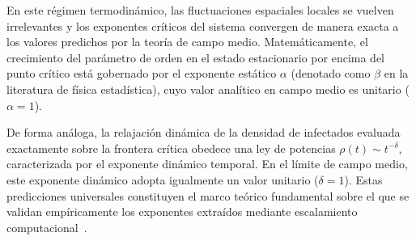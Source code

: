 \documentclass[%
reprint,
amsmath,amssymb,
aps,
]{revtex4-2}
\begin{document}
	En este régimen termodinámico, las fluctuaciones espaciales locales se vuelven irrelevantes y los exponentes críticos del sistema convergen de manera exacta a los valores predichos por la teoría de campo medio. Matemáticamente, el crecimiento del parámetro de orden en el estado estacionario por encima del punto crítico está gobernado por el exponente estático $\alpha$ (denotado como $\beta$ en la literatura de física estadística), cuyo valor analítico en campo medio es unitario ($\alpha = 1$). 
	
	De forma análoga, la relajación dinámica de la densidad de infectados evaluada exactamente sobre la frontera crítica obedece una ley de potencias $\rho(t) \sim t^{-\delta}$, caracterizada por el exponente dinámico temporal. En el límite de campo medio, este exponente dinámico adopta igualmente un valor unitario ($\delta = 1$). Estas predicciones universales constituyen el marco teórico fundamental sobre el que se validan empíricamente los exponentes extraídos mediante escalamiento computacional~\cite{Odor2004,Noest1986}.
	
	
	
\end{document}
